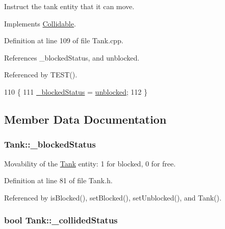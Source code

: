 Instruct the tank entity that it can move. 



Implements \hyperlink{classCollidable_a817d864d0640bc6bcb13bbecf14ddf31}{Collidable}.



Definition at line 109 of file Tank.\-cpp.



References \-\_\-blocked\-Status, and unblocked.



Referenced by T\-E\-S\-T().


\begin{DoxyCode}
110 \{
111     \hyperlink{classTank_a55423a404ce9c8b772462665769141a5}{\_blockedStatus} = \hyperlink{Structures_8h_a6fef29d9424addfa69bdd2a379424896a1596fbf6035468467c790068b609ced3}{unblocked};
112 \}
\end{DoxyCode}


\subsection{Member Data Documentation}
\hypertarget{classTank_a55423a404ce9c8b772462665769141a5}{
\subsubsection[{\-\_\-blocked\-Status}]{ Tank\-::\-\_\-blocked\-Status\hspace{0.3cm}{\ttfamily [private]}}}\label{classTank_a55423a404ce9c8b772462665769141a5}


Movability of the \hyperlink{classTank}{Tank} entity\-: 1 for blocked, 0 for free. 



Definition at line 81 of file Tank.\-h.



Referenced by is\-Blocked(), set\-Blocked(), set\-Unblocked(), and Tank().

\hypertarget{classTank_af2526be40c377df7652b5d7c314c7861}{
\subsubsection[{\-\_\-collided\-Status}]{\setlength{\rightskip}{0pt plus 5cm}bool Tank\-::\-\_\-collided\-Status\hspace{0.3cm}{\ttfamily [private]}}}\label{classTank_af2526be40c377df7652b5d7c314c7861}


